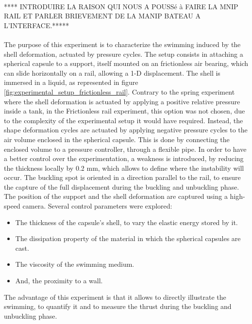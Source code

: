 \paragraph{}
**** INTRODUIRE LA RAISON QUI NOUS A POUSSé à FAIRE LA MNIP RAIL ET PARLER BRIEVEMENT DE LA MANIP BATEAU A L'INTERFACE.*****
\paragraph{}
The purpose of this experiment is to characterize the swimming induced by the shell deformation, actuated by pressure cycles. The setup consists in attaching a spherical capsule to a support, itself mounted on an frictionless air bearing, which can slide horizontally on a rail, allowing a 1-D displacement. The shell is immersed in a liquid, as represented in figure \ref{fig:experimental_setup_frictionless_rail}. Contrary to the spring experiment where the shell deformation is actuated by applying a positive relative pressure inside a tank, in the Frictionless rail experiment, this option was not chosen, due to the complexity of the experimental setup it would have required. Instead, the shape deformation cycles are actuated by applying negative pressure cycles to the air volume enclosed in the spherical capsule. This is done by connecting the enclosed volume to a pressure controller, through a flexible pipe. In order to have a better control over the experimentation, a weakness is introduced, by reducing the thickness locally by 0.2 mm, which allows to define where the instability will occur. The buckling spot is oriented in a direction parallel to the rail, to ensure the capture of the full displacement during the buckling and unbuckling phase. The position of the support and the shell deformation are captured using a high-speed camera. Several control parameters were explored:
\begin{itemize}
	\item The thickness of the capsule's shell, to vary the elastic energy stored by it.
	\item The dissipation property of the material in which the spherical capsules are cast.
	\item The viscosity of the swimming medium.
	\item And, the proximity to a wall.
\end{itemize}
The advantage of this experiment is that it allows to directly illustrate the swimming, to quantify it and to measure the thrust during the buckling and unbuckling phase.
